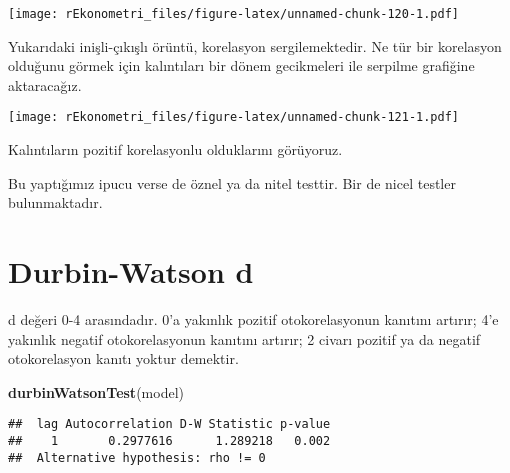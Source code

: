 \documentclass[
]{book}
\newenvironment{Shaded}{\begin{snugshade}}{\end{snugshade}}
\newcommand{\DataTypeTok}[1]{\textcolor[rgb]{0.13,0.29,0.53}{#1}}
\newcommand{\FloatTok}[1]{\textcolor[rgb]{0.00,0.00,0.81}{#1}}
\newcommand{\KeywordTok}[1]{\textcolor[rgb]{0.13,0.29,0.53}{\textbf{#1}}}
\newcommand{\NormalTok}[1]{#1}
\newcommand{\OperatorTok}[1]{\textcolor[rgb]{0.81,0.36,0.00}{\textbf{#1}}}
\newcommand{\OtherTok}[1]{\textcolor[rgb]{0.56,0.35,0.01}{#1}}
\newcommand{\StringTok}[1]{\textcolor[rgb]{0.31,0.60,0.02}{#1}}
\begin{document}
\texttt{[image: rEkonometri\_files/figure-latex/unnamed-chunk-120-1.pdf]}

Yukarıdaki inişli-çıkışlı örüntü, korelasyon sergilemektedir. Ne tür bir korelasyon olduğunu görmek için kalıntıları bir dönem gecikmeleri ile serpilme grafiğine aktaracağız.

\begin{Shaded}
\end{Shaded}

\texttt{[image: rEkonometri\_files/figure-latex/unnamed-chunk-121-1.pdf]}

Kalıntıların pozitif korelasyonlu olduklarını görüyoruz.

Bu yaptığımız ipucu verse de öznel ya da nitel testtir. Bir de nicel testler bulunmaktadır.

\hypertarget{durbin-watson-d}{%
\section{Durbin-Watson d}\label{durbin-watson-d}}

d değeri 0-4 arasındadır. 0'a yakınlık pozitif otokorelasyonun kanıtını artırır; 4'e yakınlık negatif otokorelasyonun kanıtını artırır; 2 civarı pozitif ya da negatif otokorelasyon kanıtı yoktur demektir.

\begin{Shaded}
\begin{Highlighting}[]
\KeywordTok{durbinWatsonTest}\NormalTok{(model)}
\end{Highlighting}
\end{Shaded}

\begin{verbatim}
##  lag Autocorrelation D-W Statistic p-value
##    1       0.2977616      1.289218   0.002
##  Alternative hypothesis: rho != 0
\end{verbatim}
\end{document}
